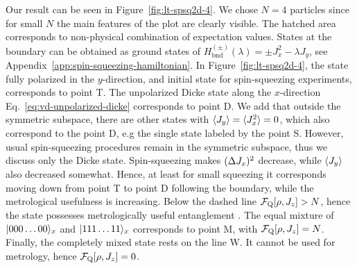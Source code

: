 Our result can be seen in Figure~\ref{fig:lt-spsq2d-4}.
We chose $N=4$ particles since for small $N$ the main features of the plot are clearly visible.
The hatched area corresponds to non-physical combination of expectation values.
States at the boundary can be obtained as ground states of $H_{\text{bnd}}^{(\pm)}(\lambda)=\pm J_x^2 -\lambda J_y$, see Appendix~\ref{app:spin-squeezing-hamiltonian}.
In Figure~\ref{fig:lt-spsq2d-4}, the state fully polarized in the $y$-direction, and initial state for spin-squeezing experiments, corresponds to point T.
The unpolarized Dicke state along the $x$-direction Eq.~\eqref{eq:vd-unpolarized-dicke} corresponds to point D.
We add that outside the symmetric subspace, there are other states with $\langle{J_y}\rangle=\langle{J_x^2}\rangle=0$, which also correspond to the point D, e.g the single state labeled by the point S.
However, usual spin-squeezing procedures remain in the symmetric subspace, thus we discuss only the Dicke state.
Spin-squeezing makes $(\Delta J_x )^2$ decrease, while $\langle{J_y}\rangle$ also decreased somewhat.
Hence, at least for small squeezing it corresponds moving down from point T to point D following the boundary, while the metrological usefulness is increasing.
Below the dashed line $\mathcal{F}_{\textnormal{Q}}[{\textstyle \rho,J_z}]>N$, hence the state possesses metrologically useful entanglement \cite{Pezze2009}.
The equal mixture of $\vert{000\dots00}\rangle_x$ and $\vert{111\dots11}\rangle_x$ corresponds to point M, with $\mathcal{F}_{\textnormal{Q}}[{\textstyle \rho,J_z}] = N$.
Finally, the completely mixed state rests on the line W.
It cannot be used for metrology, hence $\mathcal{F}_{\textnormal{Q}}[{\textstyle \rho,J_z}]=0$.
